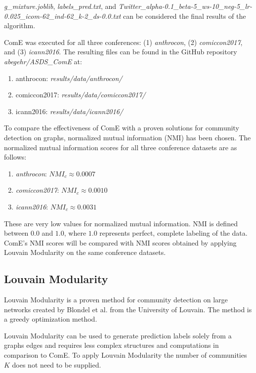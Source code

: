 \documentclass[sigconf]{acmart}
\begin{document}
\textit{g\_mixture.joblib}, \textit{labels\_pred.txt}, and \textit{Twitter\_alpha-0.1\_beta-5\_ws-10\_neg-5\_lr-0.025\_icom-62\_ind-62\_k-2\_ds-0.0.txt} can be considered the final results of the algorithm.

ComE was executed for all three conferences: (1) \textit{anthrocon}, (2) \textit{comiccon2017}, and (3) \textit{icann2016}. The resulting files can be found in the GitHub repository \textit{abegehr/ASDS\_ComE}\cite{asds} at:
\begin{enumerate}
	\item anthrocon: \textit{results/data/anthrocon/}
	\item comiccon2017: \textit{results/data/comiccon2017/}
	\item icann2016: \textit{results/data/icann2016/}
\end{enumerate}

To compare the effectiveness of ComE with a proven solutions for community detection on graphs, normalized mutual information (NMI) has been chosen. The normalized mutual information scores for all three conference datasets are as follows:

\begin{enumerate}
	\item \textit{anthrocon}: $NMI_c \approx 0.0007$
	\item \textit{comiccon2017}: $NMI_c \approx 0.0010$
	\item \textit{icann2016}: $NMI_c \approx 0.0031$
\end{enumerate}

These are very low values for normalized mutual information. NMI is defined between $0.0$ and $1.0$, where $1.0$ represents perfect, complete labeling of the data. ComE's NMI scores will be compared with NMI scores obtained by applying Louvain Modularity on the same conference datasets.

\subsection{Louvain Modularity} \label{apply_lm}

Louvain Modularity is a proven method for community detection on large networks created by Blondel et al. from the University of Louvain. The method is a greedy optimization method. \cite{lou_mod}

Louvain Modularity can be used to generate prediction labels solely from a graphs edges and requires less complex structures and computations in comparison to ComE. To apply Louvain Modularity the number of communities $K$ does not need to be supplied.
\end{document}
